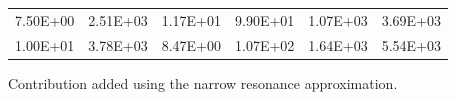 \begin{table}[]
\begin{center}
\begin{threeparttable}
\begin{tabular}{@{}llllll@{}}
7.50E+00 & 2.51E+03                & 1.17E+01                 & 9.90E+01                & 1.07E+03                & 3.69E+03          \\
1.00E+01 & 3.78E+03                & 8.47E+00                 & 1.07E+02                & 1.64E+03                & 5.54E+03          \\ \bottomrule
\end{tabular}
\begin{tablenotes}
\small 
\item * Contribution added using the narrow resonance approximation.
\end{tablenotes}
\end{threeparttable}
\label{table: rr_compare}
\end{center}
\end{table}


